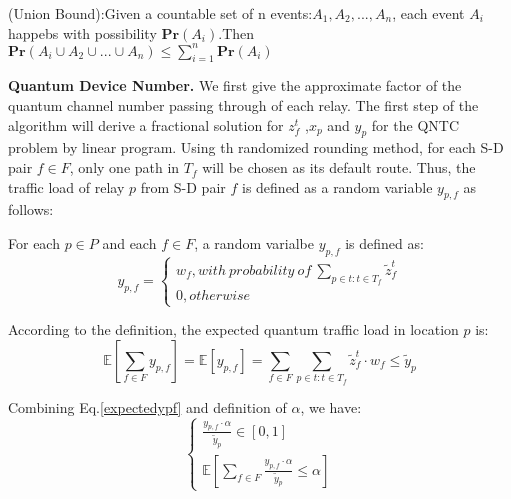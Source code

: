 \begin{lemma}
(Union Bound):Given a countable set of n events:$A_1,A_2,...,A_n$, each event $A_i$ happebs with possibility $\textbf{Pr}(A_i)$.Then $\textbf{Pr}(A_i \cup A_2 \cup... \cup A_n) \le \sum_{i=1}^{n}\textbf{Pr}(A_i)$
\end{lemma}



\textbf{Quantum Device Number.} We first give the approximate factor of the quantum channel number passing through of each relay. The first step of the algorithm will derive a fractional solution for $z_f^t$ ,$x_p$ and $y_p$ for the QNTC problem by linear program. Using th  randomized rounding method, for each S-D pair $f \in F$, only one path in $T_f$ will be chosen as its default route. Thus, the traffic load of relay $p$ from S-D pair $f$ is defined as a random variable $y_{p,f}$ as follows:
\begin{definition}\label{def1}
For each $p \in P$ and each $f \in F$, a random varialbe $y_{p,f}$ is defined as:
\begin{equation}\label{ypf}
y_{p,f}=
\begin{cases}
   w_f, with \ probability \ of \ \sum_{p \in t:t \in T_f}\widetilde{z}_f^t \\
   0, otherwise
\end{cases}
\end{equation}

\end{definition}

According to the definition, the expected quantum traffic load in location $p$ is:
\begin{equation}\label{expectedypf}
  \mathbb{E}[\sum_{f \in F}y_{p,f}]= \mathbb{E}[y_{p,f}] = \sum_{f \in F}\sum_{p \in t:t \in T_f}\widetilde{z}_f^t \cdot w_f \le \widetilde{y}_p
\end{equation}

Combining Eq.\ref{expectedypf} and definition of $\alpha$, we have:
\begin{equation}\label{eq:relaxed}
	\begin{cases}
     \frac{y_{p,f} \cdot \alpha}{\widetilde{y}_p} \in [0,1] \\
     \mathbb{E}[\sum_{f \in F} \frac{y_{p,f} \cdot \alpha}{\widetilde{y}_p} \le \alpha]
	\end{cases}
\end{equation}


